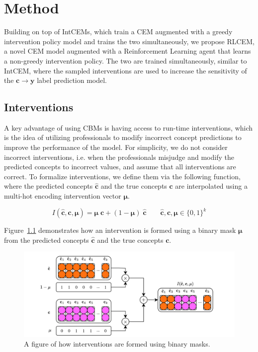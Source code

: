 \documentclass[../main.tex]{subfiles}
\begin{document}
\chapter{Method}

Building on top of IntCEMs, which train a CEM
augmented with a greedy intervention policy model and trains the two simultaneously,
we propose RLCEM,
a novel CEM model augmented with a Reinforcement Learning agent
that learns a non-greedy intervention policy.
The two are trained simultaneously, similar to IntCEM, 
where the sampled interventions are used to increase the sensitivity of the
$\mathbf{c} \to \mathbf{y}$ label prediction model.

\section{Interventions}

A key advantage of using CBMs is having access to 
run-time interventions, which is the idea of utilizing professionals
to modify incorrect concept predictions to improve the 
performance of the model.
For simplicity, we do not consider incorrect interventions, 
i.e. when the professionals misjudge and modify
 the predicted concepts to incorrect values,
and assume that
all interventions are correct. To formalize interventions, we define
them via the following function, where
the predicted concepts $\hat{\mathbf{c}}$ and the true concepts $\mathbf{c}$ are interpolated
using a multi-hot encoding intervention vector $\bm{\mu}$.

\[I(\hat{\mathbf{c}}, \mathbf{c}, \bm{\mu}) = 
\bm{\mu} \; \mathbf{c} + (1 - \bm{\mu}) \; \hat{\mathbf{c}} \qquad \hat{\mathbf{c}}, \mathbf{c}, \bm{\mu} \in \{0, 1\}^k\]

Figure~\ref{fig:interventions} demonstrates how an intervention
is formed using 
a binary mask $\bm{\mu}$ from the predicted concepts $\hat{\mathbf{c}}$ and the true concepts $\mathbf{c}$.

\begin{figure}[!h]
    \centering
    \includegraphics[width=\textwidth]{figs/method/interventions.png}
    \caption{A figure of how interventions are formed using binary masks.}
    \label{fig:interventions}
\end{figure}
\end{document}
